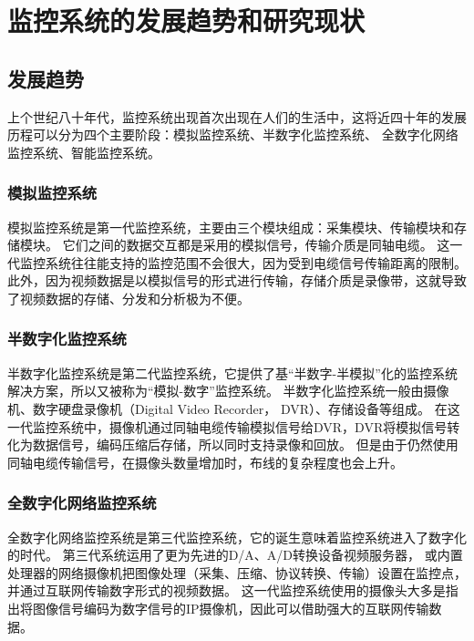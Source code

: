 

\section{监控系统的发展趋势和研究现状}
\subsection{发展趋势}
上个世纪八十年代，监控系统出现首次出现在人们的生活中，这将近四十年的发展历程可以分为四个主要阶段：模拟监控系统、半数字化监控系统、
全数字化网络监控系统、智能监控系统。

\subsubsection{模拟监控系统}
模拟监控系统是第一代监控系统，主要由三个模块组成：采集模块、传输模块和存储模块。
它们之间的数据交互都是采用的模拟信号，传输介质是同轴电缆。
这一代监控系统往往能支持的监控范围不会很大，因为受到电缆信号传输距离的限制。
此外，因为视频数据是以模拟信号的形式进行传输，存储介质是录像带，这就导致了视频数据的存储、分发和分析极为不便。

\subsubsection{半数字化监控系统}
半数字化监控系统是第二代监控系统，它提供了基“半数字-半模拟”化的监控系统解决方案，所以又被称为“模拟-数字”监控系统。
半数字化监控系统一般由摄像机、数字硬盘录像机（Digital Video Recorder， DVR）、存储设备等组成。
在这一代监控系统中，摄像机通过同轴电缆传输模拟信号给DVR，DVR将模拟信号转化为数据信号，编码压缩后存储，所以同时支持录像和回放。
但是由于仍然使用同轴电缆传输信号，在摄像头数量增加时，布线的复杂程度也会上升。

\subsubsection{全数字化网络监控系统}
全数字化网络监控系统是第三代监控系统，它的诞生意味着监控系统进入了数字化的时代。
第三代系统运用了更为先进的D/A、A/D转换设备视频服务器，
或内置处理器的网络摄像机把图像处理（采集、压缩、协议转换、传输）设置在监控点\cite{百度百科-全数字监控系统}，
并通过互联网传输数字形式的视频数据。
这一代监控系统使用的摄像头大多是指出将图像信号编码为数字信号的IP摄像机，因此可以借助强大的互联网传输数据。

